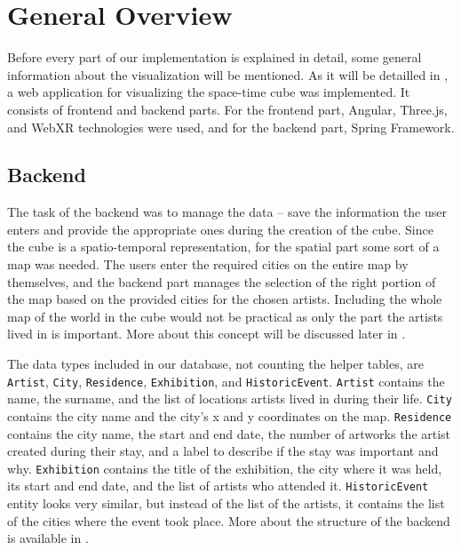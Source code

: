 \section{General Overview}\label{sec:general-overview}
Before every part of our implementation is explained in detail, some general information about the visualization will be mentioned. As it will be detailled in ,
a web application for visualizing the space-time cube was implemented. It consists of frontend and backend parts. For the frontend part, Angular,
Three.js, and WebXR technologies were used, and for the backend part, Spring Framework.

\subsection{Backend}\label{subsec:backend}
The task of the backend was to manage the data -- save the information the user enters and provide the appropriate ones during the creation of the
cube. Since the cube is a spatio-temporal representation, for the spatial part some sort of a map was needed. The users enter the required cities on the
entire map by themselves, and the backend part manages the selection of the right portion of the map based on the provided cities for the chosen artists.
Including the whole map of the world in the cube would not be practical as only the part the artists lived in is important. More about this
concept will be discussed later in .

The data types included in our database, not counting the helper tables, are \texttt{Artist}, \texttt{City}, \texttt{Residence}, \texttt{Exhibition}, and
\texttt{HistoricEvent}. \texttt{Artist} contains the name, the surname, and the list of locations artists lived in during their life. \texttt{City}
contains the city name and the city's x and y coordinates on the map. \texttt{Residence} contains the city name, the start and end date, the number of
artworks the artist created during their stay, and a label to describe if the stay was important and why. \texttt{Exhibition} contains the title of the
exhibition, the city where it was held, its start and end date, and the list of artists who attended it. \texttt{HistoricEvent} entity looks very similar,
but instead of the list of the artists, it contains the list of the cities where the event took place. More about the structure of the backend is
available in .

\clearpage

